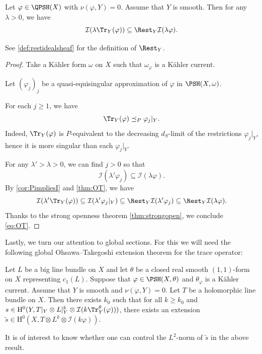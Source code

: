 \begin{proposition}\label{prop:OT2}
    Let $\varphi\in \QPSH(X)$ with $\nu(\varphi,Y)=0$. Assume that $Y$ is smooth.
    Then for any $\lambda>0$, we have
    \begin{equation}\label{eq:OT}
        \mathcal{I}(\lambda \Tr_Y(\varphi))\subseteq \Rest_Y\mathcal{I}(\lambda \varphi).
    \end{equation}
\end{proposition}
See \cref{def:restidealsheaf} for the definition of $\Rest_Y$.

\begin{proof}
Take a Kähler form $\omega$ on $X$ such that $\omega_{\varphi}$ is a Kähler current.

Let $(\varphi_j)_j$ be a quasi-equisingular approximation of $\varphi$ in $\PSH(X,\omega)$.

For each $j\geq 1$, we have
\[
\Tr_Y(\varphi) \preceq_P \varphi_j|_Y.
\]
Indeed, $\Tr_Y(\varphi)$ is $P$-equivalent to the decreasing $d_S$-limit of
the restrictions $\varphi_j|_Y$, hence it is more singular than each
$\varphi_j|_Y$.

For any $\lambda'>\lambda>0$, we can find $j>0$ so that
\[
    \mathcal{I}(\lambda' \varphi_j)\subseteq \mathcal{I}(\lambda \varphi).
\]
By \cref{cor:PimpliesI} and \cref{thm:OT}, we have
\[
    \mathcal{I}(\lambda' \Tr_Y(\varphi))\subseteq \mathcal{I}(\lambda' \varphi_j|_Y)\subseteq \Rest_Y\mathcal{I}(\lambda'\varphi_j)\subseteq \Rest_Y\mathcal{I}(\lambda \varphi).
\]
Thanks to the strong openness theorem \cref{thm:strongopen}, we conclude \eqref{eq:OT}.
\end{proof}


Lastly, we turn our attention to global sections. For this we will need the following global Ohsawa--Takegoshi extension theorem for the trace operator:

\begin{theorem}\label{thm:OT_ext_global}
    Let $L$ be a big line bundle on $X$ and let $\theta$ be a closed real smooth $(1,1)$-form on $X$ representing $c_1(L)$.
Suppose that $\varphi\in \PSH(X,\theta)$ and $\theta_{\varphi}$ is a Kähler current. Assume that $Y$ is smooth and $\nu(\varphi,Y)=0$.
Let $T$ be a holomorphic line bundle on $X$.
Then there exists $k_0$ such that for all $k \geq k_0$ and $s \in \mathrm{H}^0(Y, T|_Y\otimes L|_Y^k\otimes \mathcal{I}(k \Tr_Y^{\theta}(\varphi)))$, there exists an extension $\tilde s \in \mathrm{H}^0(X, T\otimes L^k \otimes \mathcal{I}(k\varphi))$.
\end{theorem}
It is of interest to know whether one can control the $L^2$-norm of $\tilde{s}$ in the above result.

